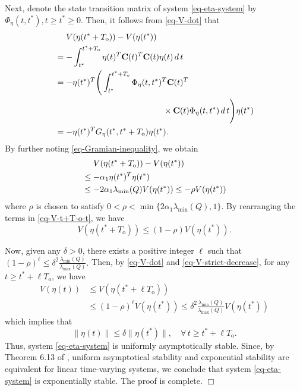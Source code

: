 \documentclass[twocolumn]{autart}
\begin{document}
Next, denote the state transition matrix of system \eqref{eq-eta-system}
by $\Phi_{\eta}(t,t^{*}), t\ge t^{*} \ge 0$.
Then, it follows from \eqref{eq-V-dot} that
\begin{align*}
   &\quad\ V(\eta(t^{*}+T_{\text{o}}))-V(\eta(t^{*})) \notag\\
   &=- \int_{t^{*}}^{t^{*}+T_{\text{o}}} \eta(t)^{T}\mathbf{C}(t)^{T}\mathbf{C}(t)\eta(t)\, d \, t\notag\\
   &=- \eta(t^{*})^{T}\Bigg( \int_{t^{*}}^{t^{*}+T_{\text{o}}} \Phi_{\eta}(t,t^{*})^{T}\mathbf{C}(t)^{T} \notag\\
   &\qquad\qquad\qquad\qquad\qquad\qquad\quad \times   \mathbf{C}(t)\Phi_{\eta}(t,t^{*})\, d \, t \Bigg)\eta(t^{*}) \notag\\
   &=- \eta(t^{*})^{T} G_{\eta}(t^{*},t^{*}+T_{\text{o}})\eta(t^{*}).
\end{align*}
By further noting \eqref{eq-Gramian-inequality}, we obtain
\begin{align}\label{eq-V-t+T-o-t}
&\quad\ V(\eta(t^{*}+T_{\text{o}}))-V(\eta(t^{*})) \notag\\
& \le -\alpha_{1} \eta(t^{*})^{T} \eta(t^{*}) \notag \\
& \le -2\alpha_{1}\lambda_{\min}(Q) V(\eta(t^{*})) \le  -\rho V(\eta(t^{*}))
\end{align}
where $\rho$ is chosen to satisfy $0< \rho < \min\{2\alpha_{1} \lambda_{\min}(Q), 1\}$.
By rearranging the terms in \eqref{eq-V-t+T-o-t}, we have
\begin{equation}\label{eq-V-strict-decrease}
    V(\eta(t^{*}+T_{\text{o}}))\le (1-\rho)V(\eta(t^{*})).
\end{equation}




Now, given any $\delta>0$, there exists a positive integer $\ell$ such that
$
    (1-\rho)^{\ell} \le \delta^{2} \frac{\lambda_{\min}(Q)}{\lambda_{\max}(Q)}.
$
Then, by \eqref{eq-V-dot} and \eqref{eq-V-strict-decrease},
for any $t \ge t^{*}+\ell T_{\text{o}}$, we have
\begin{align*}
    V(\eta(t)) & \le V(\eta(t^{*}+\ell T_{\text{o}}))\\
    & \le (1-\rho)^{\ell}V(\eta(t^{*})) \le  \delta^{2} \frac{\lambda_{\min}(Q)}{\lambda_{\max}(Q)} V(\eta(t^{*}))
\end{align*}
which implies that
\begin{equation*}\label{}
    \|\eta(t)\| \le \delta \|\eta(t^{*})\|, \quad \forall\, t \ge t^{*}+\ell T_{\text{o}}.
\end{equation*}
Thus, system \eqref{eq-eta-system} is uniformly asymptotically stable.
Since, by Theorem 6.13 of \cite{Rugh96},
uniform asymptotical stability and exponential stability are equivalent for linear time-varying systems,
we conclude that system \eqref{eq-eta-system} is exponentially stable.
The proof is complete.   \hfill $\Box$
\end{document}
